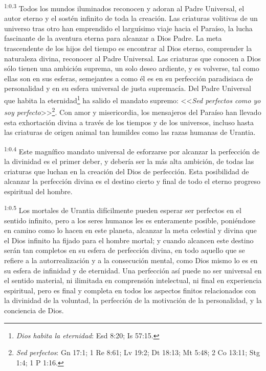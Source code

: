\par
\textsuperscript{1:0.3} Todos los mundos iluminados reconocen y adoran al Padre Universal, el autor eterno y el sostén infinito de toda la creación. Las criaturas volitivas de un universo tras otro han emprendido el larguísimo viaje hacia el Paraíso, la lucha fascinante de la aventura eterna para alcanzar a Dios Padre. La meta trascendente de los hijos del tiempo es encontrar al Dios eterno, comprender la naturaleza divina, reconocer al Padre Universal. Las criaturas que conocen a Dios sólo tienen una ambición suprema, un solo deseo ardiente, y es volverse, tal como ellas son en sus esferas, semejantes a como él es en su perfección paradisiaca de personalidad y en su esfera universal de justa supremacía. Del Padre Universal que habita la eternidad\footnote{\textit{Dios habita la eternidad}: Esd 8:20; Is 57:15.} ha salido el mandato supremo: <<\textit{Sed perfectos como yo soy perfecto}>>\footnote{\textit{Sed perfectos}: Gn 17:1; 1 Re 8:61; Lv 19:2; Dt 18:13; Mt 5:48; 2 Co 13:11; Stg 1:4; 1 P 1:16.}. Con amor y misericordia, los mensajeros del Paraíso han llevado esta exhortación divina a través de los tiempos y de los universos, incluso hasta las criaturas de origen animal tan humildes como las razas humanas de Urantia.

\par
\textsuperscript{1:0.4} Este magnífico mandato universal de esforzarse por alcanzar la perfección de la divinidad es el primer deber, y debería ser la más alta ambición, de todas las criaturas que luchan en la creación del Dios de perfección. Esta posibilidad de alcanzar la perfección divina es el destino cierto y final de todo el eterno progreso espiritual del hombre.

\par
\textsuperscript{1:0.5} Los mortales de Urantia difícilmente pueden esperar ser perfectos en el sentido infinito, pero a los seres humanos les es enteramente posible, poniéndose en camino como lo hacen en este planeta, alcanzar la meta celestial y divina que el Dios infinito ha fijado para el hombre mortal; y cuando alcancen este destino serán tan completos en su esfera de perfección divina, en todo aquello que se refiere a la autorrealización y a la consecución mental, como Dios mismo lo es en su esfera de infinidad y de eternidad. Una perfección así puede no ser universal en el sentido material, ni ilimitada en comprensión intelectual, ni final en experiencia espiritual, pero es final y completa en todos los aspectos finitos relacionados con la divinidad de la voluntad, la perfección de la motivación de la personalidad, y la conciencia de Dios.

